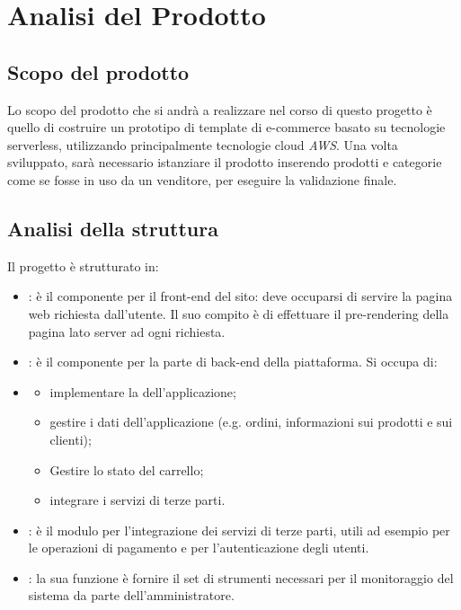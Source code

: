 \section{Analisi del Prodotto}
\subsection{Scopo del prodotto}
Lo scopo del prodotto che si andrà a realizzare nel corso di questo progetto è quello di costruire un prototipo di
template di e-commerce basato su tecnologie serverless, utilizzando principalmente tecnologie cloud \textit{AWS}.
Una volta sviluppato, sarà necessario istanziare il prodotto inserendo prodotti e categorie come se fosse in uso
da un venditore, per eseguire la validazione finale.

\subsection{Analisi della struttura}
Il progetto \textit{} è strutturato in:
\begin{itemize}
    \item \textbf{}: è il componente per il front-end del sito: deve occuparsi di servire la pagina web richiesta dall'utente. Il suo compito è di effettuare il pre-rendering della pagina lato server ad ogni richiesta.
	\item \textbf{}: è il componente per la parte di back-end della piattaforma. Si occupa di:
	\item \begin{itemize}
        \item implementare la \textit{} dell'applicazione;
        \item gestire i dati dell'applicazione (e.g. ordini, informazioni sui prodotti e sui clienti);
        \item Gestire lo stato del carrello;
        \item integrare i servizi di terze parti.
    \end{itemize}
	\item \textbf{}: è il modulo per l'integrazione dei servizi di terze parti, utili ad esempio per le operazioni di pagamento e per l'autenticazione degli utenti.
	\item \textbf{}: la sua funzione è fornire il set di strumenti necessari per il monitoraggio del sistema da parte dell'amministratore.
\end{itemize}

